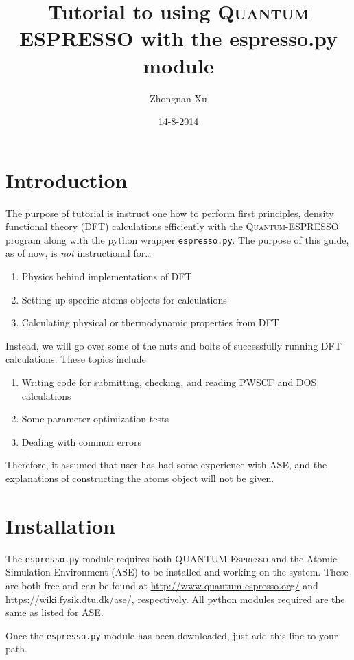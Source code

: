 \documentclass[colorlinks=true,urlcolor=blue,linkcolor=blue,citecolor=red]{article}
\author{Zhongnan Xu}
\date{14-8-2014}
\title{Tutorial to using \textsc{Quantum ESPRESSO} with the espresso.py module}
\begin{document}
\maketitle
\tableofcontents

\section{Introduction}
\label{sec-1}
The purpose of tutorial is instruct one how to perform first principles, density functional theory (DFT) calculations efficiently with the \textsc{Quantum-ESPRESSO} program along with the python wrapper \texttt{espresso.py}. The purpose of this guide, as of now, is \emph{not} instructional for\ldots{}

\begin{enumerate}
\item Physics behind implementations of DFT
\item Setting up specific atoms objects for calculations
\item Calculating physical or thermodynamic properties from DFT
\end{enumerate}

Instead, we will go over some of the nuts and bolts of successfully running DFT calculations. These topics include

\begin{enumerate}
\item Writing code for submitting, checking, and reading PWSCF and DOS calculations
\item Some parameter optimization tests
\item Dealing with common errors
\end{enumerate}

Therefore, it assumed that user has had some experience with ASE, and the explanations of constructing the atoms object will not be given.

\section{Installation}
\label{sec-2}
The \texttt{espresso.py} module requires both \textsc{QUANTUM-Espresso} and the Atomic Simulation Environment (ASE) to be installed and working on the system. These are both free and can be found at \url{http://www.quantum-espresso.org/} and \url{https://wiki.fysik.dtu.dk/ase/}, respectively. All python modules required are the same as listed for ASE.

Once the \texttt{espresso.py} module has been downloaded, just add this line to your path.
\end{document}
